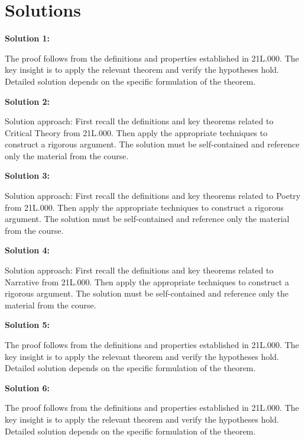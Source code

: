 \documentclass[12pt,a4paper]{exam}
\begin{document}
\newpage
\section*{Solutions}

\textbf{Solution 1:}

The proof follows from the definitions and properties established in 21L.000. The key insight is to apply the relevant theorem and verify the hypotheses hold. Detailed solution depends on the specific formulation of the theorem.

\vspace{0.5cm}

\textbf{Solution 2:}

Solution approach: First recall the definitions and key theorems related to Critical Theory from 21L.000. Then apply the appropriate techniques to construct a rigorous argument. The solution must be self-contained and reference only the material from the course.

\vspace{0.5cm}

\textbf{Solution 3:}

Solution approach: First recall the definitions and key theorems related to Poetry from 21L.000. Then apply the appropriate techniques to construct a rigorous argument. The solution must be self-contained and reference only the material from the course.

\vspace{0.5cm}

\textbf{Solution 4:}

Solution approach: First recall the definitions and key theorems related to Narrative from 21L.000. Then apply the appropriate techniques to construct a rigorous argument. The solution must be self-contained and reference only the material from the course.

\vspace{0.5cm}

\textbf{Solution 5:}

The proof follows from the definitions and properties established in 21L.000. The key insight is to apply the relevant theorem and verify the hypotheses hold. Detailed solution depends on the specific formulation of the theorem.

\vspace{0.5cm}

\textbf{Solution 6:}

The proof follows from the definitions and properties established in 21L.000. The key insight is to apply the relevant theorem and verify the hypotheses hold. Detailed solution depends on the specific formulation of the theorem.
\end{document}
